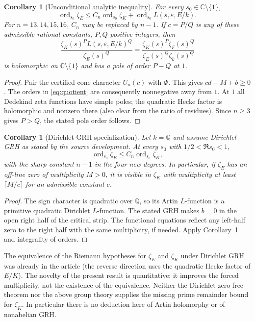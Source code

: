 \documentclass[11pt]{article}
\newtheorem{corollary}[theorem]{Corollary}
\theoremstyle{remark}
\newcommand{\ord}{\operatorname{ord}}
\newcommand{\Q}{\mathbb Q}
\newcommand{\C}{\mathbb C}
\begin{document}
\begin{corollary}[Unconditional analytic inequality]\label{cor:analytic}
For every $s_0\in\C\setminus\{1\}$,
\begin{equation}\label{eq:analytic}
 \ord_{s_0}\zeta_E\le C_n\ord_{s_0}\zeta_K+\ord_{s_0}L(s,\varepsilon,E/k).
\end{equation}
For $n=13,14,15,16$, $C_n$ may be replaced by $n-1$. If $c=P/Q$ is any of these admissible rational constants, $P,Q$ positive integers, then
\begin{equation}\label{eq:quotient}
 \frac{\zeta_K(s)^P L(s,\varepsilon,E/k)^Q}{\zeta_E(s)^Q}
 =\frac{\zeta_K(s)^P\zeta_F(s)^Q}{\zeta_E(s)^Q\zeta_k(s)^Q}
\end{equation}
 is holomorphic on $\C\setminus\{1\}$ and has a pole of order $P-Q$ at $1$.
\end{corollary}
\begin{proof}
Pair the certified cone character $U_n(c)$ with $\Phi$. This gives $cd-M+b\ge0$. The orders in \eqref{eq:quotient} are consequently nonnegative away from $1$. At $1$ all Dedekind zeta functions have simple poles; the quadratic Hecke factor is holomorphic and nonzero there (also clear from the ratio of residues). Since $n\ge3$ gives $P>Q$, the stated pole order follows.
\end{proof}

\begin{corollary}[Dirichlet GRH specialization]\label{cor:GRH}
Let $k=\Q$ and assume Dirichlet GRH as stated by the source development. At every $s_0$ with $1/2<\Re s_0<1$,
\[
 \ord_{s_0}\zeta_E\le C_n\ord_{s_0}\zeta_K,
\]
with the sharp constant $n-1$ in the four new degrees. In particular, if $\zeta_E$ has an off-line zero of multiplicity $M>0$, it is visible in $\zeta_K$ with multiplicity at least $\lceil M/c\rceil$ for an admissible constant $c$.
\end{corollary}
\begin{proof}
The sign character is quadratic over $\Q$, so its Artin $L$-function is a primitive quadratic Dirichlet $L$-function. The stated GRH makes $b=0$ in the open right half of the critical strip. The functional equations reflect any left-half zero to the right half with the same multiplicity, if needed. Apply Corollary~\ref{cor:analytic} and integrality of orders.
\end{proof}
The equivalence of the Riemann hypotheses for $\zeta_E$ and $\zeta_K$ under Dirichlet GRH was already in the article (the reverse direction uses the quadratic Hecke factor of $E/K$). The novelty of the present result is quantitative: it improves the forced multiplicity, not the existence of the equivalence. Neither the Dirichlet zero-free theorem nor the above group theory supplies the missing prime remainder bound for $\zeta_K$. In particular there is no deduction here of Artin holomorphy or of nonabelian GRH.
\end{document}
